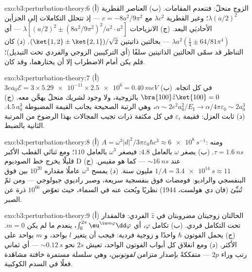 \begin{solution}{exo:b3:perturbation-theory:6}
(أ) الزوج منحلّ: فتنعدم المقامات. (ب) العناصر
القطرية $\lambda(a/2)^2$؛ وغير القطرية $\lambda c^2$ مع $c =
-8a^2/9\pi^2$ --- إذ تتحلل التكاملات إلى الجزأين
الأحاديَي البعد. (ج) الانزياحات $\lambda[(a/2)^2 \pm
(8a^2/9\pi^2)^2/a^2\cdot a^2]$ --- أي $\lambda a^2(\tfrac14 \pm
64/81\pi^4)$ --- بحالتين ذاتيتين $(\ket{1,2} \pm \ket{2,1})/
\sqrt2$. (د) كان التناظر قد سمّى الحالتين الذاتيتين سلفًا (أي
التركيبين الزوجي والفردي تحت التبديل)؛ فلم يكن أمام
الاضطراب إلا أن يختارهما، وقد كان.
\end{solution}

\begin{solution}{exo:b3:perturbation-theory:7}
(أ) $3ea_0\mathcal E = 3 \times \num{5.29e-11} \times \num{2.5e6}
= \qty{0.40}{meV}$ في كل اتجاه. (ب) $\bra{100}\hat z\ket{100} = 0$
بالزوجية، ولا وجود لشريك منحلّ يهجَّن معه. (ج)
$\alpha \sim 2e^2a_0^2/E_{\text{I}} \to \alpha/4\pi\varepsilon_0
\sim 2a_0^3$، وهي الرتبة الصحيحة بجانب القيمة المضبوطة $4.5\,a_0^3$. (د)
ثابت العزل: فقيمة $\varepsilon_{\text{r}}$ في كل مكثفة
ذرات تجيب المجالات بهذا الرضوخ من المرتبة الثانية بالضبط.
\end{solution}

\begin{solution}{exo:b3:perturbation-theory:8}
(أ) $A = \omega^3|d|^2/3\pi\varepsilon_0\hbar c^3 \approx
\qty{6e8}{s^{-1}}$: ومنه $\tau = \qty{1.6}{ns}$. (ب) يصغر $\omega$ بالعامل
$4.8$: فيصغر $\omega^3$ بالعامل $110$؛ ومع ثنائي القطب الأكبر قليلًا يخرج خط
الصوديوم D عند $\sim\qty{16}{ns}$ --- كما هو مقيس. (ج)
$1/A = \qty{3.4e14}{s} \approx 11$ مليون سنة. (د) يمسح $\omega^3$
عاملًا مقداره $10^{20}$ بين فوق البنفسجي والراديو: فومضات فوق بنفسجية سريعة،
وصبر راديوي جيولوجي --- ومن ثمّ تُنبِّئ 
(فان دي هولست، 1944) نظريًا وبُحث عنه في السماء، حيث
تعوّض $10^{66}$ ذرة عن الصبر.
\end{solution}

\begin{solution}{exo:b3:perturbation-theory:9}
(أ) الحالتان زوجيتان مضروبتان في $\hat z$ الفردي: فالمقدار تحت التكامل فردي. (ب) تكامل
$\varphi$، أي $\int_0^{2\pi}\eu^{\iu m\varphi}\dd\varphi$،
ينعدم ما لم يكن $m = 0$. (ج) يحمل الفوتون $\hbar$ واحدًا و
زوجية فردية: فيجب أن يتغير $l$ بواحد، و $m$ بواحد على الأكثر. (د) ومع
انغلاق كل أبواب الفوتون الواحد، تعيش $2s$ نحو $\sim\qty{0.12}{s}$ ---
أي ثماني رتب وراء $2p$ --- متفككةً بإصدار متزامن
\emph{لفوتونين}، وهي سلسلة مستمرة خافتة مشاهَدة فعلًا في
السدم الكوكبية.
\end{solution}

